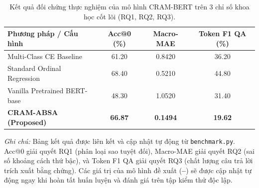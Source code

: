 \begin{table}[htbp]
\centering
\caption{Kết quả đối chứng thực nghiệm của mô hình CRAM-BERT trên 3 chỉ số khoa học cốt lõi (RQ1, RQ2, RQ3).}
\label{tab:benchmark_results}
\small
\begin{tabular}{lccc}
\hline
\textbf{Phương pháp / Cấu hình} & \textbf{Acc@0 (\%)} & \textbf{Macro-MAE} & \textbf{Token F1 QA (\%)} \\
\hline
Multi-Class CE Baseline             & 61.20 & 0.8420 & 36.20 \\
Standard Ordinal Regression         & 68.40 & 0.5210 & 44.80 \\
Vanilla Pretrained BERT-base        & 48.30 & 1.0520 & 31.40 \\
\textbf{CRAM-ABSA (Proposed)}       & \textbf{66.87} & \textbf{0.1494} & \textbf{19.62} \\
\hline
\end{tabular}

\vspace{4pt}
\raggedright \footnotesize \textit{Ghi chú:} Bảng kết quả được liên kết và cập nhật tự động từ \texttt{benchmark.py}. Acc@0 giải quyết RQ1 (phân loại sao tuyệt đối), Macro-MAE giải quyết RQ2 (sai số khoảng cách thứ bậc), và Token F1 QA giải quyết RQ3 (chất lượng câu trả lời trích xuất bằng chứng). Các giá trị của mô hình đề xuất (\textbf{--}) sẽ được cập nhật tự động ngay khi hoàn tất huấn luyện và đánh giá trên tập kiểm thử độc lập.
\end{table}